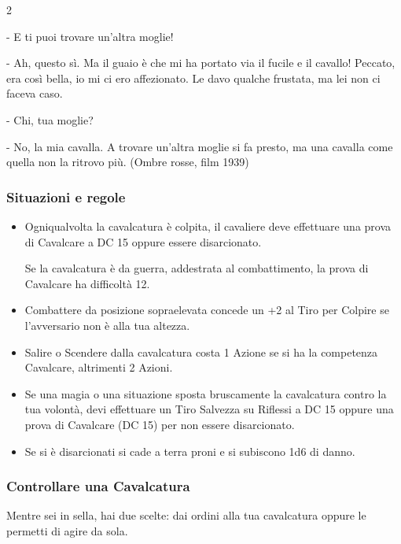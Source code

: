 \begin{multicols}{2}
\begin{enfasi}{
- E ti puoi trovare un'altra moglie!

- Ah, questo sì. Ma il guaio è che mi ha portato via il fucile e il cavallo! Peccato, era così bella, io mi ci ero affezionato. Le davo qualche frustata, ma lei non ci faceva caso.

- Chi, tua moglie?

- No, la mia cavalla. A trovare un'altra moglie si fa presto, ma una cavalla come quella non la ritrovo più. (Ombre rosse, film 1939)}\end{enfasi}

\subsubsection{Situazioni e regole}\label{cavallosituazioniregole}

\begin{itemize}[leftmargin=*] \setlength{\itemsep}{0pt}
\item
Ogniqualvolta la cavalcatura è colpita, il cavaliere deve effettuare una prova di Cavalcare a DC 15 oppure essere disarcionato.

Se la cavalcatura è da guerra, addestrata al combattimento, la prova di Cavalcare ha difficoltà 12.

\item
Combattere da posizione sopraelevata concede un +2 al Tiro per Colpire se l'avversario non è alla tua altezza.

\item
Salire o Scendere dalla cavalcatura costa 1 Azione se si ha la competenza Cavalcare, altrimenti 2 Azioni.

\item
Se una magia o una situazione sposta bruscamente la cavalcatura contro la tua volontà, devi effettuare un Tiro Salvezza su Riflessi a DC 15 oppure una prova di Cavalcare (DC 15) per non essere disarcionato.

\item
Se si è disarcionati si cade a terra proni e si subiscono 1d6 di danno.
\end{itemize}

\subsubsection{Controllare una Cavalcatura}\label{controllocavalcatura}

Mentre sei in sella, hai due scelte: dai ordini alla tua cavalcatura oppure le permetti di agire da sola.


\end{multicols}

